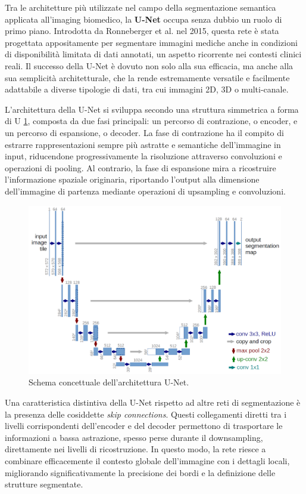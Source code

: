 
Tra le architetture più utilizzate nel campo della segmentazione semantica applicata all’imaging biomedico, la \textbf{U-Net} occupa senza dubbio un ruolo di primo piano. Introdotta da Ronneberger et al. nel 2015, questa rete è stata progettata appositamente per segmentare immagini mediche anche in condizioni di disponibilità limitata di dati annotati, un aspetto ricorrente nei contesti clinici reali. Il successo della U-Net è dovuto non solo alla sua efficacia, ma anche alla sua semplicità architetturale, che la rende estremamente versatile e facilmente adattabile a diverse tipologie di dati, tra cui immagini 2D, 3D o multi-canale.

L'architettura della U-Net si sviluppa secondo una struttura simmetrica a forma di U \ref{fig:Schema concettuale dell'architettura U-Net}, composta da due fasi principali: un percorso di contrazione, o encoder, e un percorso di espansione, o decoder. La fase di contrazione ha il compito di estrarre rappresentazioni sempre più astratte e semantiche dell’immagine in input, riducendone progressivamente la risoluzione attraverso convoluzioni e operazioni di pooling. Al contrario, la fase di espansione mira a ricostruire l’informazione spaziale originaria, riportando l’output alla dimensione dell’immagine di partenza mediante operazioni di upsampling e convoluzioni.

\begin{figure}[H]
  	\centering 
 	\includegraphics[width=.6\textwidth]{figures/U-Net-architecture.png} 
	 \caption{Schema concettuale dell'architettura U-Net.}
	 \label{fig:Schema concettuale dell'architettura U-Net}
	\end{figure} 

Una caratteristica distintiva della U-Net rispetto ad altre reti di segmentazione è la presenza delle cosiddette \textit{skip connections}. Questi collegamenti diretti tra i livelli corrispondenti dell’encoder e del decoder permettono di trasportare le informazioni a bassa astrazione, spesso perse durante il downsampling, direttamente nei livelli di ricostruzione. In questo modo, la rete riesce a combinare efficacemente il contesto globale dell’immagine con i dettagli locali, migliorando significativamente la precisione dei bordi e la definizione delle strutture segmentate.

